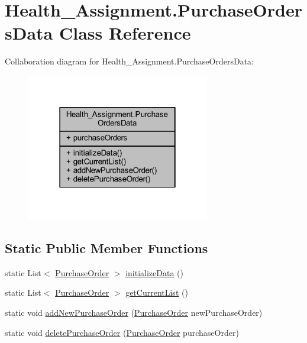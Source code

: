 \hypertarget{class_health___assignment_1_1_purchase_orders_data}{}\section{Health\+\_\+\+Assignment.\+Purchase\+Orders\+Data Class Reference}
\label{class_health___assignment_1_1_purchase_orders_data}


Collaboration diagram for Health\+\_\+\+Assignment.\+Purchase\+Orders\+Data\+:\nopagebreak
\begin{figure}[H]
\begin{center}
\leavevmode
\includegraphics[width=226pt]{class_health___assignment_1_1_purchase_orders_data__coll__graph}
\end{center}
\end{figure}
\subsection*{Static Public Member Functions}
\begin{DoxyCompactItemize}
\item 
static List$<$ \hyperlink{class_health___assignment_1_1_purchase_order}{Purchase\+Order} $>$ \hyperlink{class_health___assignment_1_1_purchase_orders_data_af854843557eaab98f73ab7ef3976aeb8}{initialize\+Data} ()
\item 
static List$<$ \hyperlink{class_health___assignment_1_1_purchase_order}{Purchase\+Order} $>$ \hyperlink{class_health___assignment_1_1_purchase_orders_data_aef768684a04943e77d24185aa0ba0641}{get\+Current\+List} ()
\item 
static void \hyperlink{class_health___assignment_1_1_purchase_orders_data_a2527dea69e8da96d627d2626fa00025b}{add\+New\+Purchase\+Order} (\hyperlink{class_health___assignment_1_1_purchase_order}{Purchase\+Order} new\+Purchase\+Order)
\item 
static void \hyperlink{class_health___assignment_1_1_purchase_orders_data_a40e933d5dc9c52b131f31d613beb14fe}{delete\+Purchase\+Order} (\hyperlink{class_health___assignment_1_1_purchase_order}{Purchase\+Order} purchase\+Order)
\end{DoxyCompactItemize}
